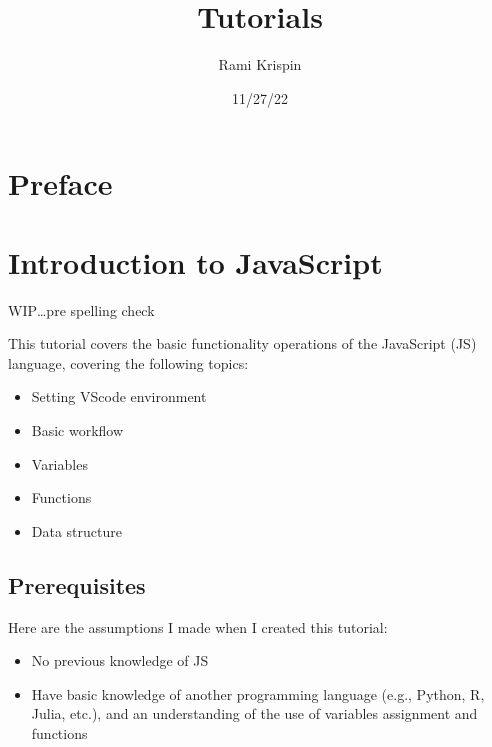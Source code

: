 \documentclass[
  letterpaper,
  DIV=11,
  numbers=noendperiod]{scrreprt}
\title{Tutorials}
\author{Rami Krispin}
\date{11/27/22}
\providecommand{\tightlist}{%
  \setlength{\itemsep}{0pt}\setlength{\parskip}{0pt}}\usepackage{longtable,booktabs,array}
\renewcommand*\contentsname{Table of contents}
\newcommand\contentsname{Table of contents}
\begin{document}
\maketitle
\ifdefined\Shaded\renewenvironment{Shaded}{\begin{tcolorbox}[borderline west={3pt}{0pt}{shadecolor}, enhanced, sharp corners, frame hidden, interior hidden, breakable, boxrule=0pt]}{\end{tcolorbox}}\fi

\renewcommand*\contentsname{Table of contents}
{
\hypersetup{linkcolor=}
\setcounter{tocdepth}{2}
\tableofcontents
}

\hypertarget{preface}{%
\chapter*{Preface}\label{preface}}



\hypertarget{introduction-to-javascript}{%
\chapter{Introduction to JavaScript}\label{introduction-to-javascript}}

WIP\ldots pre spelling check

This tutorial covers the basic functionality operations of the
JavaScript (JS) language, covering the following topics:

\begin{itemize}
\tightlist
\item
  Setting VScode environment
\item
  Basic workflow
\item
  Variables
\item
  Functions
\item
  Data structure
\end{itemize}

\hypertarget{prerequisites}{%
\section{Prerequisites}\label{prerequisites}}

Here are the assumptions I made when I created this tutorial:

\begin{itemize}
\tightlist
\item
  No previous knowledge of JS
\item
  Have basic knowledge of another programming language (e.g., Python, R,
  Julia, etc.), and an understanding of the use of variables assignment
  and functions
\end{itemize}
\end{document}
